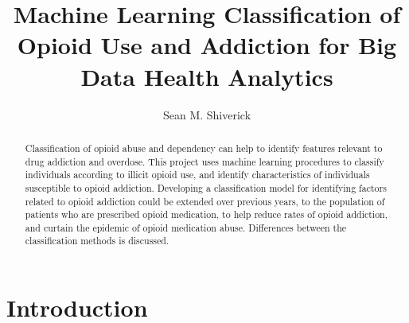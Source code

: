 \documentclass[sigconf]{acmart}
\begin{document}
\title{Machine Learning Classification of Opioid Use and Addiction
for Big Data Health Analytics}

  \author{Sean M. Shiverick}


\begin{abstract}
Classification of opioid abuse and dependency can help to identify features
relevant to drug addiction and overdose. This project uses machine learning
procedures to classify individuals according to illicit opioid use, and
identify characteristics of individuals susceptible to opioid addiction.
Developing a classification model for identifying factors related to opioid 
addiction could be extended over previous years, to the population of
patients who are prescribed opioid medication, to help reduce rates of 
opioid addiction, and curtain the epidemic of opioid medication abuse.  
Differences between the classification methods is discussed.

\end{abstract}


\maketitle

\section{Introduction}
\end{document}
